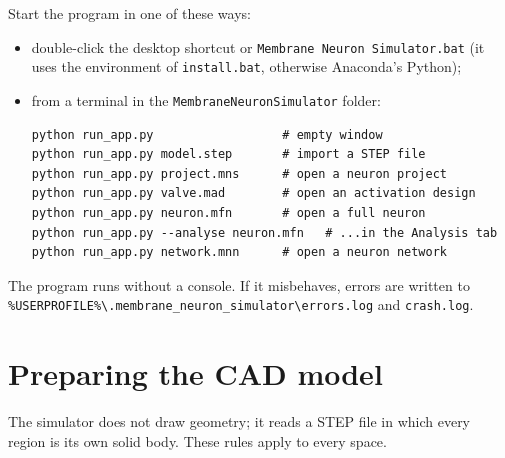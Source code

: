 \documentclass[11pt,a4paper]{article}
\newcommand{\code}[1]{\texttt{#1}}
\begin{document}
Start the program in one of these ways:
\begin{itemize}
\item double-click the desktop shortcut or \code{Membrane Neuron Simulator.bat} (it uses the environment of
\code{install.bat}, otherwise Anaconda's Python);
\item from a terminal in the \code{MembraneNeuronSimulator} folder:
\begin{verbatim}
python run_app.py                  # empty window
python run_app.py model.step       # import a STEP file
python run_app.py project.mns      # open a neuron project
python run_app.py valve.mad        # open an activation design
python run_app.py neuron.mfn       # open a full neuron
python run_app.py --analyse neuron.mfn   # ...in the Analysis tab
python run_app.py network.mnn      # open a neuron network
\end{verbatim}
\end{itemize}

The program runs without a console. If it misbehaves, errors are written to
\code{\%USERPROFILE\%\textbackslash.membrane\_neuron\_simulator\textbackslash errors.log} and \code{crash.log}.

\section{Preparing the CAD model}
\label{sec:cad}

The simulator does not draw geometry; it reads a STEP file in which every region is its own solid body. These rules
apply to every space.
\end{document}
